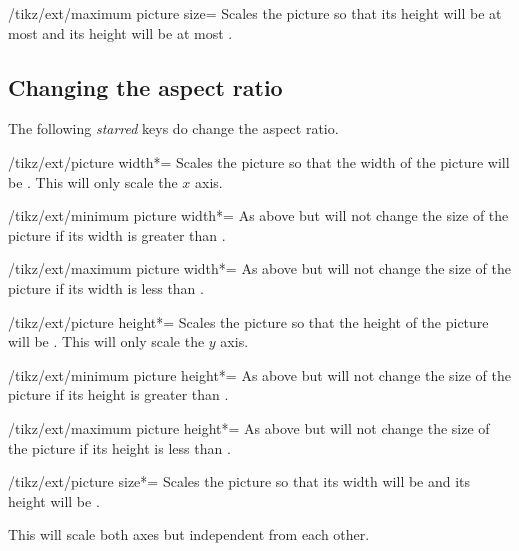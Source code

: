 \begin{multicols}{2}
\begin{key}{/tikz/ext/maximum picture size=}
  Scales the picture so that its height will be at most 
  and its height will be at most .
\end{key}

\subsection{Changing the aspect ratio}
The following \emph{starred} keys do change the aspect ratio.
\begin{key}{/tikz/ext/picture width*=}
  Scales the picture so that the width of the picture will be .
  This will only scale the $x$ axis.
\end{key}

\begin{key}{/tikz/ext/minimum picture width*=}
  As above but will not change the size of the picture
  if its width is greater than .
\end{key}

\begin{key}{/tikz/ext/maximum picture width*=}
  As above but will not change the size of the picture
  if its width is less than .
\end{key}

\begin{key}{/tikz/ext/picture height*=}
  Scales the picture so that the height of the picture will be .
  This will only scale the $y$ axis.
\end{key}

\begin{key}{/tikz/ext/minimum picture height*=}
  As above but will not change the size of the picture
  if its height is greater than .
\end{key}

\begin{key}{/tikz/ext/maximum picture height*=}
  As above but will not change the size of the picture
  if its height is less than .
\end{key}

\begin{key}{/tikz/ext/picture size*=}
  Scales the picture so that its width will be 
  and its height will be .
  
  This will scale both axes but independent from each other.
\end{key}
\end{multicols}